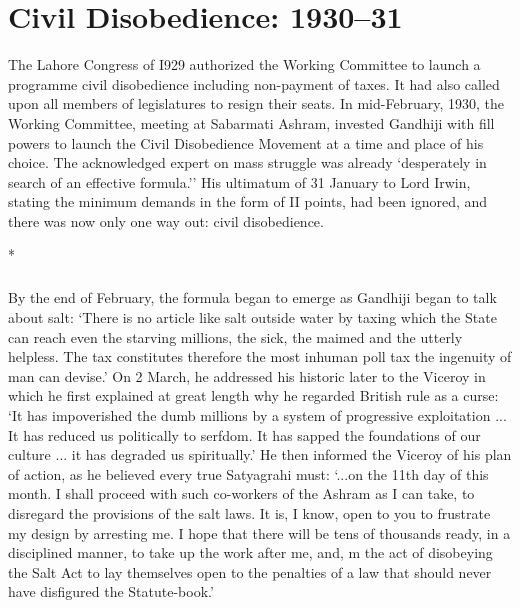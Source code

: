 \chapter{Civil Disobedience: 1930--31}

The Lahore Congress of I929 authorized the Working Committee to launch a programme civil disobedience including non-payment of taxes. It had also called upon all members of legislatures to resign their seats. In mid-February, 1930, the Working Committee, meeting at Sabarmati Ashram, invested Gandhiji with fill powers to launch the Civil Disobedience Movement at a time and place of his choice. The acknowledged expert on mass struggle was already `desperately in search of an effective formula.'' His ultimatum of 31 January to Lord Irwin, stating the minimum demands in the form of II points, had been ignored, and there was now only one way out: civil disobedience.

\begin{center}*\end{center}

\paragraph*{}


By the end of February, the formula began to emerge as Gandhiji began to talk about salt: `There is no article like salt outside water by taxing which the State can reach even the starving millions, the sick, the maimed and the utterly helpless. The tax constitutes therefore the most inhuman poll tax the ingenuity of man can devise.' On 2 March, he addressed his historic later to the Viceroy in which he first explained at great length why he regarded British rule as a curse: `It has impoverished the dumb millions by a system of progressive exploitation ... It has reduced us politically to serfdom. It has sapped the foundations of our culture ... it has degraded us spiritually.' He then informed the Viceroy of his plan of action, as he believed every true Satyagrahi must: `...on the 11th day of this month. I shall proceed with such co-workers of the Ashram as I can take, to disregard the provisions of the salt laws. It is, I know, open to you to frustrate my design by arresting me. I hope that there will be tens of thousands ready, in a disciplined manner, to take up the work after me, and, m the act of disobeying the Salt Act to lay themselves open to the penalties of a law that should never have disfigured the Statute-book.'

